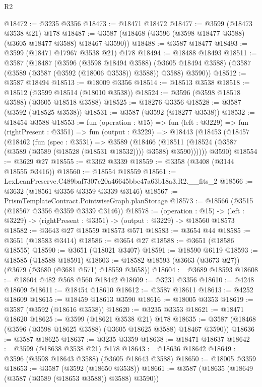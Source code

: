 \begin{lexlean}{R2}
\begin{coremodule}
@18472 := @3235 @3356
@18473 := @18471 @18472
@18477 := @3599 (@18473 @3538 @21) @178
@18487 := @3587 (@18468 (@3596 (@3598 @18477 @3588) (@3605 @18477 @3588) @18467 @3590))
@18488 := @3587 @18477
@18493 := @3599 (@18471 @17967 @3538 @21) @178
@18494 := @18488 @18493
@18511 := @3587
    (@18487
      (@3596
        (@3598 @18494 @3588)
        (@3605 @18494 @3588)
        (@3587 (@3589 (@3587 (@3592 (@18006 @3538)) @3588)) @3588)
        @3590))
@18512 := @3587 @18494
@18513 := @18009 @3356
@18514 := @18513 @3538
@18518 := @18512 (@3599 @18514 (@18010 @3538))
@18524 := @3596 (@3598 @18518 @3588) (@3605 @18518 @3588)
@18525 := @18276 @3356
@18528 := @3587 (@3592 (@18525 @3538))
@18531 := @3587 (@3592 (@18277 @3538))
@18532 := @18454 @3588
@18553 := fun (operation : @15) =>
  fun (left : @3229) =>
  fun (rightPresent : @3351) =>
  fun (output : @3229) =>
  @18443
    (@18453
      (@18457
        (@18462
          (fun (spec : @3531) =>
          @3589
            (@18466
              (@18511 (@18524 (@3587 (@3589 (@3589 (@18528 (@18531 @18532)))) @3588) @3590))))))
      @3590)
@18554 := @3629 @27
@18555 := @3362 @3339
@18559 := @3358 (@3408 (@3144 @18555 @3416))
@18560 := @18554 @18559
@18561 := LexLeanPreserve.C489baf7307c20a46645bbc47a63b18a3.R2.__fits_2
@18566 := @3632 (@18561 @3356 @3359 @3339 @3146)
@18567 := PrismTemplateContract.PointwiseGraph.planStorage
@18573 := @18566 (@3515 (@18567 @3356 @3359 @3339 @3146))
@18578 := (operation : @15) ->
  (left : @3229) -> (rightPresent : @3351) -> (output : @3229) -> @18560 @18573
@18582 := @3643 @27 @18559 @18573 @571
@18583 := @3654 @44
@18585 := @3651 (@18583 @3414)
@18586 := @3654 @27
@18588 := @3651 (@18586 @18555)
@18590 := @3651 (@18021 @3407)
@18591 := @18590 @6119
@18593 := @18585 (@18588 @18591)
@18603 := @18582 @18593 (@3663 (@3673 @27)) (@3679 (@3680 (@3681 @571) @18559 @3658))
@18604 := @3689 @18593
@18608 := @18604 @482 @568 @560 @18442
@18609 := @3231 @3356
@18610 := @4248 @18609
@18611 := @18454 @18610
@18612 := @3587 @18611
@18613 := @4252 @18609
@18615 := @18459 @18613 @3590
@18616 := @18005 @3353
@18619 := @3587 (@3592 (@18616 @3538))
@18620 := @3235 @3353
@18621 := @18471 @18620
@18625 := @3599 (@18621 @3538 @21) @178
@18635 := @3587 (@18468 (@3596 (@3598 @18625 @3588) (@3605 @18625 @3588) @18467 @3590))
@18636 := @3587 @18625
@18637 := @3235 @3359
@18638 := @18471 @18637
@18642 := @3599 (@18638 @3538 @21) @178
@18643 := @18636 @18642
@18649 := @3596 (@3598 @18643 @3588) (@3605 @18643 @3588)
@18650 := @18005 @3359
@18653 := @3587 (@3592 (@18650 @3538))
@18661 := @3587 (@18635 (@18649 (@3587 (@3589 (@18653 @3588)) @3588) @3590))

\end{coremodule}
\end{lexlean}
